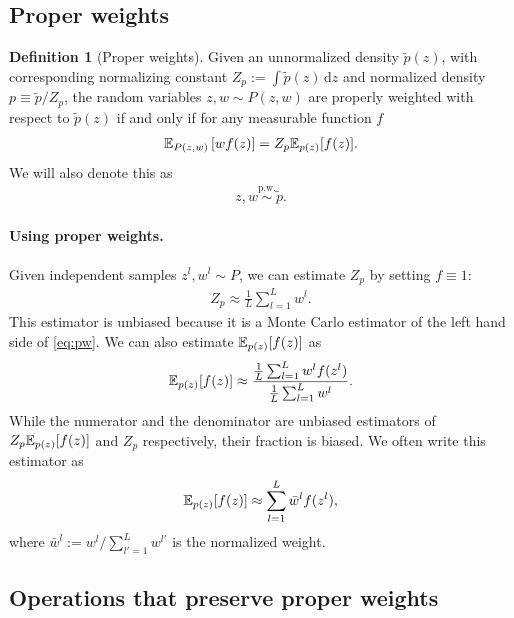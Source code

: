 \documentclass{article}
\theoremstyle{definition}
\newtheorem{definition}{Definition}
\newcommand{\pw}{\overset{\text{p.w.}}{\sim}
}
\begin{document}
\subsection{Proper weights}

\begin{definition}[Proper weights]
    Given an unnormalized density $\tilde p(z)$, with corresponding normalizing constant $Z_p := \int \tilde p(z) \,\mathrm dz$ and normalized density $p \equiv \tilde p / Z_p$, the random variables $z, w \sim P(z, w)$ are properly weighted with respect to $\tilde p(z)$ if and only if for any measurable function $f$
    \begin{align}
    \label{eq:pw}
    \mathbb{E}_{P(z, w)}\left[w f(z)\right] = Z_p \mathbb{E}_{p(z)}[f(z)]. 
    \end{align}
    We will also denote this as
    \begin{align*}
        z, w \pw \tilde p.
    \end{align*}
\end{definition}

\paragraph{Using proper weights.}
Given independent samples $z^l, w^l \sim P$, we can estimate $Z_p$ by setting $f \equiv 1$:
\begin{align*}
    Z_p \approx \frac{1}{L} \sum_{l = 1}^L w^l.
\end{align*}
This estimator is unbiased because it is a Monte Carlo estimator of the left hand side of \eqref{eq:pw}.
We can also estimate $\mathbb{E}_{p(z)}[f(z)]$ as
\begin{align*}
    \mathbb{E}_{p(z)}[f(z)] \approx \frac{\frac{1}{L} \sum_{l = 1}^L w^l f(z^l)}{\frac{1}{L} \sum_{l = 1}^L w^l}.
\end{align*}
While the numerator and the denominator are unbiased estimators of $Z_p \mathbb{E}_{p(z)}[f(z)]$ and $Z_p$ respectively, their fraction is biased.
We often write this estimator as
\begin{align}
    \mathbb{E}_{p(z)}[f(z)] \approx \sum_{l = 1}^L \bar w^l f(z^l), \label{eq:pw-estimation}
\end{align}
where $\bar w^l := w^l / \sum_{l' = 1}^L w^{l'}$ is the normalized weight.

\subsection{Operations that preserve proper weights}
\end{document}
